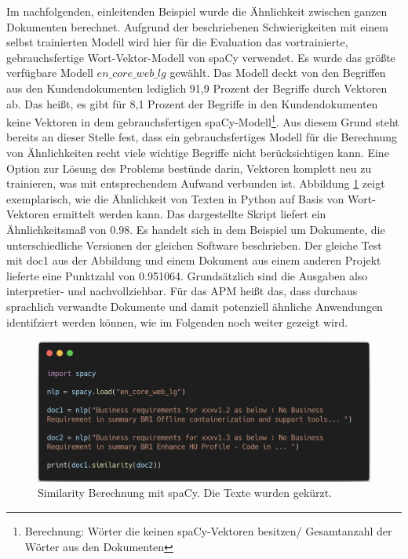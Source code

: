 Im nachfolgenden, einleitenden Beispiel wurde die Ähnlichkeit zwischen ganzen Dokumenten berechnet. 
Aufgrund der beschriebenen Schwierigkeiten mit einem selbst trainierten Modell wird hier für die Evaluation das vortrainierte, gebrauchsfertige Wort-Vektor-Modell von spaCy verwendet. Es wurde das größte verfügbare Modell \(en\_core\_web\_lg\) gewählt. Das Modell deckt von den Begriffen aus den Kundendokumenten lediglich 91,9 Prozent der Begriffe durch Vektoren ab. Das heißt, es gibt für 8,1 Prozent der Begriffe in den Kundendokumenten keine Vektoren in dem gebrauchsfertigen spaCy-Modell\footnote{Berechnung: Wörter die keinen spaCy-Vektoren besitzen/ Gesamtanzahl der Wörter aus den Dokumenten}. Aus diesem Grund steht bereits an dieser Stelle fest, dass ein gebrauchsfertiges Modell für die Berechnung von Ähnlichkeiten recht viele wichtige Begriffe nicht berücksichtigen kann. Eine Option zur Lösung des Problems bestünde darin, Vektoren komplett neu zu trainieren, was mit entsprechendem Aufwand verbunden ist. Abbildung \ref{Abbildung:listing_1} zeigt exemplarisch, wie die Ähnlichkeit von Texten in Python auf Basis von Wort-Vektoren ermittelt werden kann. Das dargestellte Skript liefert ein Ähnlichkeitsmaß von 0.98. Es handelt sich in dem Beispiel um Dokumente, die unterschiedliche Versionen der gleichen Software beschrieben. Der gleiche Test mit doc1 aus der Abbildung und einem Dokument aus einem anderen Projekt lieferte eine Punktzahl von 0.951064. Grundsätzlich sind die Ausgaben also interpretier- und nachvollziehbar. Für das APM heißt das, dass durchaus sprachlich verwandte Dokumente und damit potenziell ähnliche Anwendungen identifziert werden können, wie im Folgenden noch weiter gezeigt wird. 

\begin{figure}[h]
\centering
\includegraphics[scale=0.35]{content/pics/Listing_1_.png}
\caption{Similarity Berechnung mit spaCy. Die Texte wurden gekürzt.}
\label{Abbildung:listing_1}
\end{figure}

